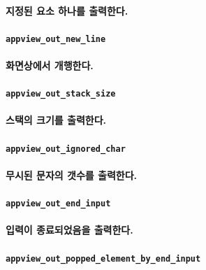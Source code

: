 \documentclass[UTF8]{report}
\begin{document}
            \paragraph{%
                \normalfont 지정된 요소 하나를 출력한다.
            }
            
            \paragraph{\texttt{appview\_out\_new\_line}}
            \paragraph{%
                \normalfont 화면상에서 개행한다.
            }

            \paragraph{\texttt{appview\_out\_stack\_size}}
            \paragraph{%
                \normalfont 스택의 크기를 출력한다.
            }

            \paragraph{\texttt{appview\_out\_ignored\_char}}
            \paragraph{%
                \normalfont 무시된 문자의 갯수를 출력한다.
            }

            \paragraph{\texttt{appview\_out\_end\_input}}
            \paragraph{%
                \normalfont 입력이 종료되었음을 출력한다.
            }

            \paragraph{\texttt{appview\_out\_popped\_element\_by\_end\_input}}
\end{document}
